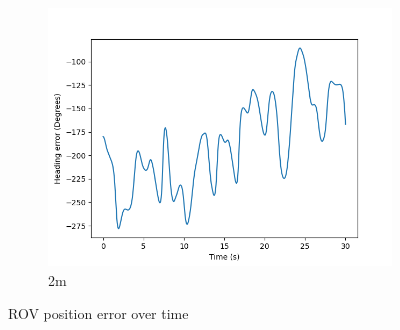 \documentclass[class=article, crop=false]{standalone}
\begin{document}
\begin{figure}
\begin{subfigure}[b]{0.48\textwidth}
        \includegraphics{scenario1/rov-50m/2.0m/usv_heading_error_controlled}
        \caption{2m}
        \label{}
    \end{subfigure}

    \caption{ROV position error over time}
\end{figure}
\end{document}
